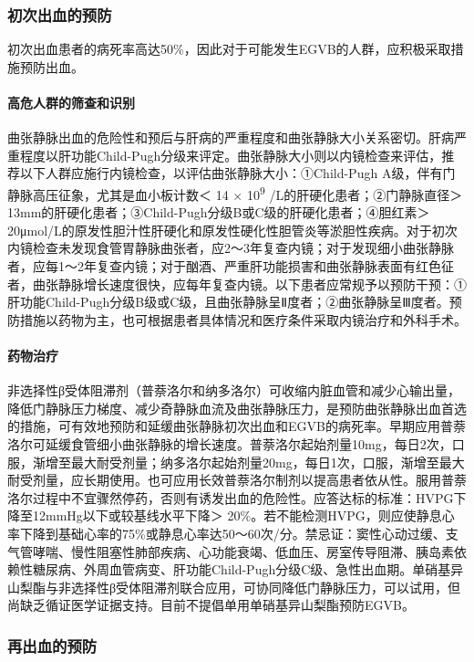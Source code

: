 \subsubsection{初次出血的预防}

初次出血患者的病死率高达50\%，因此对于可能发生EGVB的人群，应积极采取措施预防出血。

\paragraph{高危人群的筛查和识别}

曲张静脉出血的危险性和预后与肝病的严重程度和曲张静脉大小关系密切。肝病严重程度以肝功能Child-Pugh分级来评定。曲张静脉大小则以内镜检查来评估，推荐以下人群应施行内镜检查，以评估曲张静脉大小：①Child-Pugh
A级，伴有门静脉高压征象，尤其是血小板计数＜ 14 × 10\textsuperscript{9}
/L的肝硬化患者；②门静脉直径＞
13mm的肝硬化患者；③Child-Pugh分级B或C级的肝硬化患者；④胆红素＞
20μmol/L的原发性胆汁性肝硬化和原发性硬化性胆管炎等淤胆性疾病。对于初次内镜检查未发现食管胃静脉曲张者，应2～3年复查内镜；对于发现细小曲张静脉者，应每1～2年复查内镜；对于酗酒、严重肝功能损害和曲张静脉表面有红色征者，曲张静脉增长速度很快，应每年复查内镜。以下患者应常规予以预防干预：①肝功能Child-Pugh分级B级或C级，且曲张静脉呈Ⅱ度者；②曲张静脉呈Ⅲ度者。预防措施以药物为主，也可根据患者具体情况和医疗条件采取内镜治疗和外科手术。

\paragraph{药物治疗}

非选择性β受体阻滞剂（普萘洛尔和纳多洛尔）可收缩内脏血管和减少心输出量，降低门静脉压力梯度、减少奇静脉血流及曲张静脉压力，是预防曲张静脉出血首选的措施，可有效地预防和延缓曲张静脉初次出血和EGVB的病死率。早期应用普萘洛尔可延缓食管细小曲张静脉的增长速度。普萘洛尔起始剂量10mg，每日2次，口服，渐增至最大耐受剂量；纳多洛尔起始剂量20mg，每日1次，口服，渐增至最大耐受剂量，应长期使用。也可应用长效普萘洛尔制剂以提高患者依从性。服用普萘洛尔过程中不宜骤然停药，否则有诱发出血的危险性。应答达标的标准：HVPG下降至12mmHg以下或较基线水平下降＞
20\%。若不能检测HVPG，则应使静息心率下降到基础心率的75\%或静息心率达50～60次/分。禁忌证：窦性心动过缓、支气管哮喘、慢性阻塞性肺部疾病、心功能衰竭、低血压、房室传导阻滞、胰岛素依赖性糖尿病、外周血管病变、肝功能Child-Pugh分级C级、急性出血期。单硝基异山梨酯与非选择性β受体阻滞剂联合应用，可协同降低门静脉压力，可以试用，但尚缺乏循证医学证据支持。目前不提倡单用单硝基异山梨酯预防EGVB。

\subsubsection{再出血的预防}

